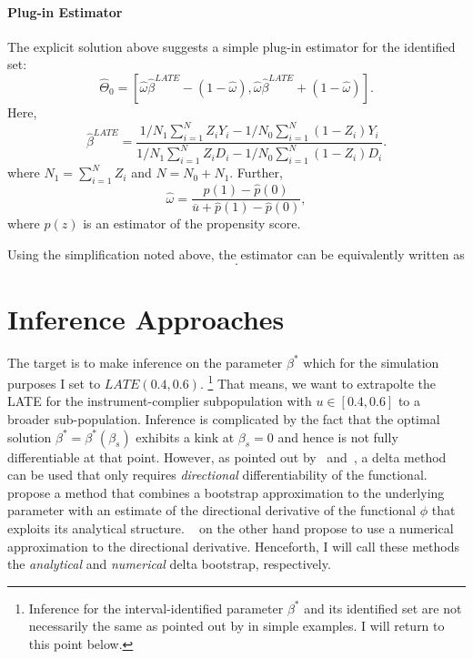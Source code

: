 \documentclass[11pt,a4paper,english]{article} %
\numberwithin{equation}{section}
\numberwithin{figure}{section}
\numberwithin{table}{section}
\theoremstyle{definition}
\theoremstyle{remark}
\begin{document}
\paragraph{Plug-in Estimator}
The explicit solution above suggests a simple plug-in estimator for the identified set:
\begin{equation}
	\hat{\Theta}_0 = \left[\hat{\omega} \hat{\beta}^{LATE} - (1-\hat{\omega}), \hat{\omega}\hat{\beta}^{LATE} + (1-\hat{\omega}) \right].
\end{equation}
Here,
\begin{equation}
	\hat{\beta}^{LATE}  = \frac{1/N_1 \sum_{i=1}^N Z_i Y_i - 1/N_0 \sum_{i=1}^N(1-Z_i)Y_i}{1/N_1\sum_{i=1}^N Z_i D_i - 1/N_0\sum_{i=1}^N (1-Z_i)D_i}.
\end{equation}
where $N_1 = \sum_{i=1}^N Z_i$ and $N = N_0 + N_1$. Further,
\begin{equation}
	\hat{\omega} = \frac{\hat{p}(1) - \hat{p}(0)}{\overline{u} + \hat{p}(1) - \hat{p}(0)},
\end{equation}
where $\hat{p}(z)$ is an estimator of the propensity score.

Using the simplification noted above, the estimator can be equivalently written as
\begin{equation}
	.
\end{equation}

\section{Inference Approaches}

The target is to make inference on the parameter $\beta^*$ which for the simulation purposes I set to $LATE(0.4, 0.6)$.
\footnote{Inference for the interval-identified parameter $\beta^*$ and its identified set are not necessarily the same as pointed out by \cite{imbens2004confidence} in simple examples. I will return to this point below.}
That means, we want to extrapolte the LATE for the instrument-complier subpopulation with $u\in[0.4, 0.6]$ to a broader sub-population.
Inference is complicated by the fact that the optimal solution $\beta^* = \beta^*(\beta_s)$ exhibits a kink at $\beta_s=0$ and hence is not fully differentiable at that point.
However, as pointed out by~\cite{fang2023inference} and~\cite{hong2018numerical}, a delta method can be used that only requires \textit{directional} differentiability of the functional.
~\cite{fang2023inference} propose a method that combines a bootstrap approximation to the underlying parameter with an estimate of the directional derivative of the functional $\phi$ that exploits its analytical structure.
~\cite{hong2018numerical} on the other hand propose to use a numerical approximation to the directional derivative.
Henceforth, I will call these methods the \textit{analytical} and \textit{numerical} delta bootstrap, respectively.
\end{document}

